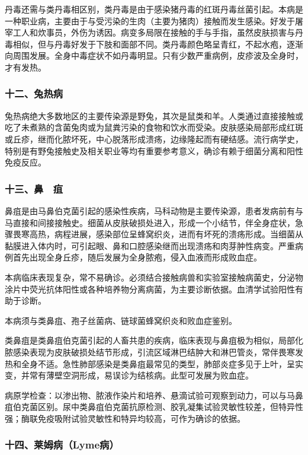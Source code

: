 丹毒还需与类丹毒相区别，类丹毒是由于感染猪丹毒的红斑丹毒丝菌引起。本病是一种职业病，主要由于与受污染的生肉（主要为猪肉）接触而发生感染。好发于屠宰工人和炊事员，外伤为诱因。病变多局限在接触的手与手指，虽然皮肤损害与丹毒相似，但与丹毒好发于下肢和面部不同。类丹毒颜色略呈青红，不起水疱，逐渐向周围发展。全身中毒症状不如丹毒明显。只有少数严重病例，皮疹波及全身时，才有发热。

\subsubsection{十二、兔热病}

兔热病绝大多数地区的主要传染源是野兔，其次是鼠类和羊。人类通过直接接触或吃了未煮熟的含菌兔肉或为鼠粪污染的食物和饮水而受染。皮肤感染局部形成红斑或丘疹，继而化脓坏死，中心脱落形成溃疡，边缘隆起而有硬结感。流行病学史，特别是有野兔接触史及相关职业等均有重要参考意义，确诊有赖于细菌分离和阳性免疫反应。

\subsubsection{十三、鼻　疽}

鼻疽是由马鼻伯克菌引起的感染性疾病，马科动物是主要传染源，患者发病前有与马直接和间接接触史。细菌从皮肤破损处进入，形成一个小结节，伴全身症状，急骤畏寒高热，病程进展，感染部位呈蜂窝织炎，进而有坏死的溃疡形成。当细菌从黏膜进入体内时，可引起眼、鼻和口腔感染继而出现溃疡和肉芽肿性病变。严重病例首先出现全身丘疹，随后发展为全身脓疱，侵入血液而形成败血症。

本病临床表现复杂，常不易确诊。必须结合接触病兽和实验室接触病菌史，分泌物涂片中荧光抗体阳性或各种培养物分离病菌，为主要诊断依据。血清学试验阳性有助于诊断。

本病须与类鼻疽、孢子丝菌病、链球菌蜂窝织炎和败血症鉴别。

类鼻疽是类鼻疽伯克菌引起的人畜共患的疾病，临床表现与鼻疽极为相似，局部化脓感染表现为皮肤破损处结节形成，引流区域淋巴结肿大和淋巴管炎，常伴畏寒发热和全身不适。急性肺部感染是类鼻疽最常见的类型，肺部炎症多见于上叶，呈实变，并常有薄壁空洞形成，易误诊为结核病。此型可发展为败血症。

病原学检查：以渗出物、脓液作染片和培养、悬滴试验可观察到动力，可以与马鼻疽伯克菌区别。尿中类鼻疽伯克菌抗原检测、胶乳凝集试验灵敏性较差，但特异性强；酶联免疫吸附试验灵敏性和特异均较高，可作为确诊的依据。

\subsubsection{十四、莱姆病（Lyme病）}

